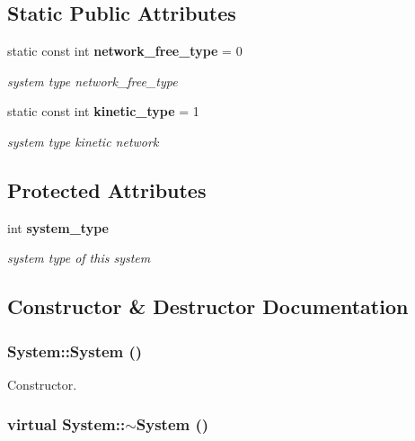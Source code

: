\subsection*{Static Public Attributes}
\begin{CompactItemize}
\item 
static const int {\bf network\_\-free\_\-type} = 0
\begin{CompactList}\small\item\em system type network\_\-free\_\-type \item\end{CompactList}\item 
static const int {\bf kinetic\_\-type} = 1
\begin{CompactList}\small\item\em system type kinetic network \item\end{CompactList}\end{CompactItemize}
\subsection*{Protected Attributes}
\begin{CompactItemize}
\item 
int {\bf system\_\-type}
\begin{CompactList}\small\item\em system type of this system \item\end{CompactList}\end{CompactItemize}


\subsection{Constructor \& Destructor Documentation}
\subsubsection[System]{\setlength{\rightskip}{0pt plus 5cm}System::System ()}\label{classSystem_e317936c9bcf1374d61745572e0f2f8a}


Constructor. 

\subsubsection[$\sim$System]{\setlength{\rightskip}{0pt plus 5cm}virtual System::$\sim$System ()\hspace{0.3cm}{\tt  [pure virtual]}}\label{classSystem_c5260040d183b1e22001d6c17fdf9e9e}


